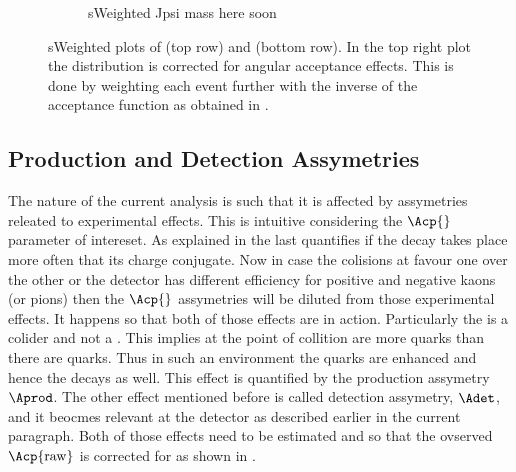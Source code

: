 \begin{figure}[h]
  \centering
  \begin{subfigure}{0.5\textwidth}
    \scalebox{0.65}{}
    \caption{}
    \label{mkpiPlot_raw}
  \end{subfigure}%
  \hfill%
  \begin{subfigure}{0.5\textwidth}
    \scalebox{0.65}{}
    \caption{}
    \label{mkpiPlot_eff}
  \end{subfigure}
  \begin{subfigure}{0.5\textwidth}
    \caption{\color{red} sWeighted Jpsi mass here soon}
    \label{jpsiPlot}
  \end{subfigure}
\caption{sWeighted plots of \mkpi(top row) and \jpsi (bottom row). In the top right plot the \mkpi distribution
         is corrected for angular acceptance effects. This is done by weighting each event further with the inverse 
         of the acceptance function as obtained in .}
\end{figure}

\subsection{Production and Detection Assymetries}
\label{experimentalAssym}
The nature of the current analysis is such that it is affected by assymetries releated to experimental effects.
This is intuitive considering the $\Acp{}$ parameter of intereset. As explained in 
the last quantifies if the decay \BsJpsiKst takes place more often that its charge conjugate. Now in case the
colisions at \lhc favour one over the other or the detector has different efficiency for positive and negative 
kaons (or pions) then the $\Acp{}$ assymetries will be diluted from those experimental effects. It happens so that
both of those effects are in action. Particularly the \lhc is a \proton\proton colider and not a \proton\antiproton .
This implies at the point of collition are more \bquark quarks than there are \bquarkbar quarks. 
Thus in such an environment the \bquark quarks are enhanced and hence the \BsbarJpsiKst 
decays as well. This effect is quantified by the production assymetry $\Aprod$. The other effect mentioned before
is called detection assymetry, $\Adet$, and it beocmes relevant at the \lhcb detector as described earlier in the
current paragraph. Both of those effects need to be estimated and so that the ovserved $\Acp{\rm raw}$ is corrected for
as shown in .

